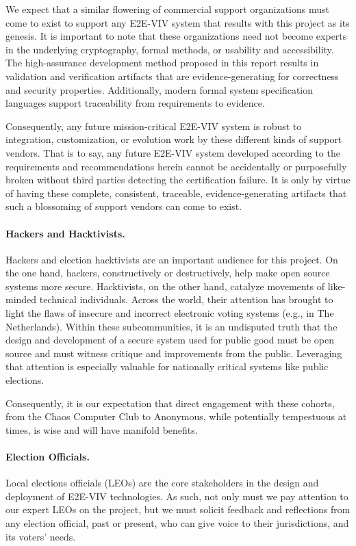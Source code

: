 We expect that a similar flowering of commercial support organizations
must come to exist to support any E2E-VIV system that results with
this project as its genesis. It is important to note that these
organizations need not become experts in the underlying cryptography,
formal methods, or usability and accessibility. The high-assurance
development method proposed in this report results in validation and
verification artifacts that are evidence-generating for correctness
and security properties.  Additionally, modern formal system
specification languages support traceability from requirements to
evidence. 

Consequently, any future mission-critical E2E-VIV system is robust to
integration, customization, or evolution work by these different kinds
of support vendors. That is to say, any future E2E-VIV system
developed according to the requirements and recommendations herein
cannot be accidentally or purposefully broken without third parties
detecting the certification failure. It is only by virtue of having
these complete, consistent, traceable, evidence-generating artifacts
that such a blossoming of support vendors can come to exist.

\paragraph{Hackers and Hacktivists.} Hackers and election hacktivists
are an important audience for this project. On the one hand, hackers,
constructively or destructively, help make open source systems more
secure.  Hacktivists, on the other hand, catalyze movements of
like-minded technical individuals. Across the world, their attention
has brought to light the flaws of insecure and incorrect electronic
voting systems (e.g., in The Netherlands).
Within these subcommunities, it is an undisputed truth that the design
and development of a secure system used for public good must be open
source and must witness critique and improvements from the public.
Leveraging that attention is especially valuable for nationally
critical systems like public elections.

Consequently, it is our expectation that direct engagement with these
cohorts, from the Chaos Computer Club to Anonymous, while potentially
tempestuous at times, is wise and will have manifold benefits.

\paragraph{Election Officials.} Local elections officials (LEOs) are
the core stakeholders in the design and deployment of E2E-VIV
technologies.  As such, not only must we pay attention to our expert
LEOs on the project, but we must solicit feedback and reflections from
any election official, past or present, who can give voice to their
jurisdictions, and its voters' needs.

